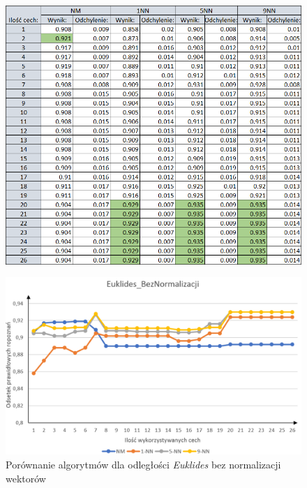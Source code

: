 \documentclass[12pt]{article}
\begin{document}
\begin{figure}[H]
	\centering
	\label{algorytmy_manhatan_bnorm_tab}
		\includegraphics[scale=0.8]{images/algorithms/manhatan_beznorm_tab.png}
	
\end{figure}


\begin{figure}[H]
	\centering
		\includegraphics[scale=0.66]{images/algorithms/euklides_beznorm.png}
	\caption{Porównanie algorytmów dla odległości \textit{Euklides} bez normalizacji wektorów}
	\label{algorytmy_euklides_bnorm_wyk}
\end{figure}
\end{document}
